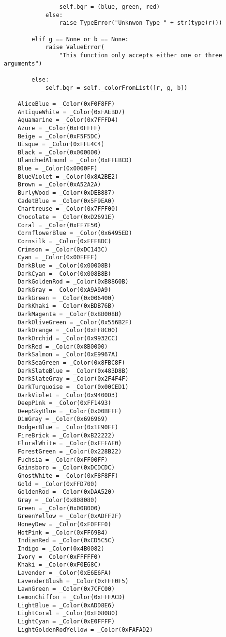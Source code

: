 \documentclass[11pt]{article}
\begin{document}
\begin{lstlisting}
                self.bgr = (blue, green, red)
            else:
                raise TypeError("Unknwon Type " + str(type(r)))

        elif g == None or b == None:
            raise ValueError(
                "This function only accepts either one or three arguments")

        else:
            self.bgr = self._colorFromList([r, g, b])

    AliceBlue = _Color(0xF0F8FF)
    AntiqueWhite = _Color(0xFAEBD7)
    Aquamarine = _Color(0x7FFFD4)
    Azure = _Color(0xF0FFFF)
    Beige = _Color(0xF5F5DC)
    Bisque = _Color(0xFFE4C4)
    Black = _Color(0x000000)
    BlanchedAlmond = _Color(0xFFEBCD)
    Blue = _Color(0x0000FF)
    BlueViolet = _Color(0x8A2BE2)
    Brown = _Color(0xA52A2A)
    BurlyWood = _Color(0xDEB887)
    CadetBlue = _Color(0x5F9EA0)
    Chartreuse = _Color(0x7FFF00)
    Chocolate = _Color(0xD2691E)
    Coral = _Color(0xFF7F50)
    CornflowerBlue = _Color(0x6495ED)
    Cornsilk = _Color(0xFFF8DC)
    Crimson = _Color(0xDC143C)
    Cyan = _Color(0x00FFFF)
    DarkBlue = _Color(0x00008B)
    DarkCyan = _Color(0x008B8B)
    DarkGoldenRod = _Color(0xB8860B)
    DarkGray = _Color(0xA9A9A9)
    DarkGreen = _Color(0x006400)
    DarkKhaki = _Color(0xBDB76B)
    DarkMagenta = _Color(0x8B008B)
    DarkOliveGreen = _Color(0x556B2F)
    DarkOrange = _Color(0xFF8C00)
    DarkOrchid = _Color(0x9932CC)
    DarkRed = _Color(0x8B0000)
    DarkSalmon = _Color(0xE9967A)
    DarkSeaGreen = _Color(0x8FBC8F)
    DarkSlateBlue = _Color(0x483D8B)
    DarkSlateGray = _Color(0x2F4F4F)
    DarkTurquoise = _Color(0x00CED1)
    DarkViolet = _Color(0x9400D3)
    DeepPink = _Color(0xFF1493)
    DeepSkyBlue = _Color(0x00BFFF)
    DimGray = _Color(0x696969)
    DodgerBlue = _Color(0x1E90FF)
    FireBrick = _Color(0xB22222)
    FloralWhite = _Color(0xFFFAF0)
    ForestGreen = _Color(0x228B22)
    Fuchsia = _Color(0xFF00FF)
    Gainsboro = _Color(0xDCDCDC)
    GhostWhite = _Color(0xF8F8FF)
    Gold = _Color(0xFFD700)
    GoldenRod = _Color(0xDAA520)
    Gray = _Color(0x808080)
    Green = _Color(0x008000)
    GreenYellow = _Color(0xADFF2F)
    HoneyDew = _Color(0xF0FFF0)
    HotPink = _Color(0xFF69B4)
    IndianRed = _Color(0xCD5C5C)
    Indigo = _Color(0x4B0082)
    Ivory = _Color(0xFFFFF0)
    Khaki = _Color(0xF0E68C)
    Lavender = _Color(0xE6E6FA)
    LavenderBlush = _Color(0xFFF0F5)
    LawnGreen = _Color(0x7CFC00)
    LemonChiffon = _Color(0xFFFACD)
    LightBlue = _Color(0xADD8E6)
    LightCoral = _Color(0xF08080)
    LightCyan = _Color(0xE0FFFF)
    LightGoldenRodYellow = _Color(0xFAFAD2)

\end{lstlisting}
\end{document}
